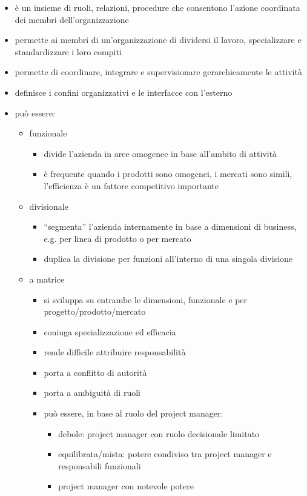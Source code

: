 \documentclass[answers, a4paper, 11pt]{exam}
\begin{document}
\begin{itemize}
    \item è un insieme di ruoli, relazioni, procedure che consentono l'azione coordinata dei membri dell'organizzazione
    \item permette ai membri di un'organizzazione di dividersi il lavoro, specializzare e standardizzare i loro compiti
    \item permette di coordinare, integrare e supervisionare gerarchicamente le attività
    \item definisce i confini organizzativi e le interfacce con l'esterno
    \item può essere:
    \begin{itemize}
        \item funzionale
        \begin{itemize}
            \item divide l'azienda in aree omogenee in base all'ambito di attività
            \item è frequente quando i prodotti sono omogenei, i mercati sono simili, l'efficienza è un fattore competitivo importante
        \end{itemize}
        \item divisionale
        \begin{itemize}
            \item ``segmenta'' l'azienda internamente in base a dimensioni di business, e.g. per linea di prodotto o per mercato
            \item duplica la divisione per funzioni all'interno di una singola divisione
        \end{itemize}
        \item a matrice
        \begin{itemize}
            \item si sviluppa su entrambe le dimensioni, funzionale e per progetto/prodotto/mercato
            \item coniuga specializzazione ed efficacia
            \item rende difficile attribuire responsabilità
            \item porta a conflitto di autorità
            \item porta a ambiguità di ruoli
            \item può essere, in base al ruolo del project manager:
            \begin{itemize}
                \item debole: project manager con ruolo decisionale limitato
                \item equilibrata/mista: potere condiviso tra project manager e responsabili funzionali
                \item project manager con notevole potere
            \end{itemize}
        \end{itemize}
    \end{itemize}
\end{itemize}
\end{document}
